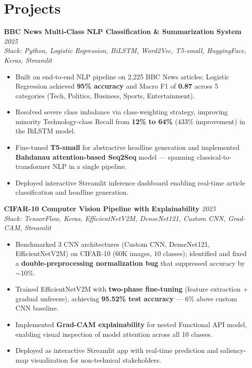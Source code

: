 \documentclass[11pt, a4paper]{article}
\newcommand{\projectEntry}[3]{
  \textbf{#1} \hfill \textit{#2} \\
  \textit{Stack: #3}
  \vspace{2pt}
}
\begin{document}
\vspace{2pt}

\section{Projects}

\projectEntry{BBC News Multi-Class NLP Classification \& Summarization System}{2025}
             {Python, Logistic Regression, BiLSTM, Word2Vec, T5-small, HuggingFace, Keras, Streamlit}
\begin{itemize}
  \item Built an end-to-end NLP pipeline on 2,225 BBC News articles; Logistic Regression achieved \textbf{95\% accuracy} and Macro F1 of \textbf{0.87} across 5 categories (Tech, Politics, Business, Sports, Entertainment).
  \item Resolved severe class imbalance via class-weighting strategy, improving minority Technology-class Recall from \textbf{12\% to 64\%} (433\% improvement) in the BiLSTM model.
  \item Fine-tuned \textbf{T5-small} for abstractive headline generation and implemented \textbf{Bahdanau attention-based Seq2Seq} model --- spanning classical-to-transformer NLP in a single pipeline.
  \item Deployed interactive Streamlit inference dashboard enabling real-time article classification and headline generation.
\end{itemize}

\vspace{4pt}

\projectEntry{CIFAR-10 Computer Vision Pipeline with Explainability}{2025}
             {TensorFlow, Keras, EfficientNetV2M, DenseNet121, Custom CNN, Grad-CAM, Streamlit}
\begin{itemize}
  \item Benchmarked 3 CNN architectures (Custom CNN, DenseNet121, EfficientNetV2M) on CIFAR-10 (60K images, 10 classes); identified and fixed a \textbf{double-preprocessing normalization bug} that suppressed accuracy by $\sim$10\%.
  \item Trained EfficientNetV2M with \textbf{two-phase fine-tuning} (feature extraction + gradual unfreeze), achieving \textbf{95.52\% test accuracy} --- 6\% above custom CNN baseline.
  \item Implemented \textbf{Grad-CAM explainability} for nested Functional API model, enabling visual inspection of model attention across all 10 classes.
  \item Deployed as interactive Streamlit app with real-time prediction and saliency-map visualization for non-technical stakeholders.
\end{itemize}
\end{document}
